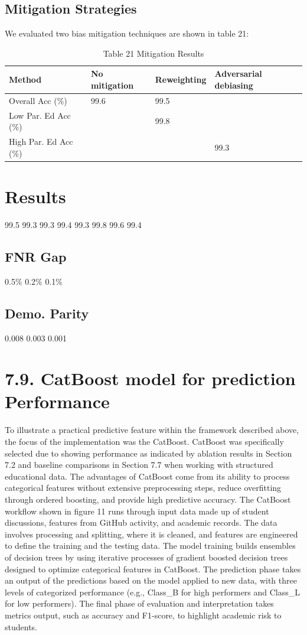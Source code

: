 \documentclass[twocolumn]{svjour3}
\begin{document}
\subsection{Mitigation Strategies}
We evaluated two bias mitigation techniques are shown in table 21:
\begin{table}
\centering
\caption{Table 21 Mitigation Results}
\begin{tabular}{lll}
\hline
Method & No mitigation & Reweighting & Adversarial debiasing \\
\hline
Overall Acc (\%) & 99.6 & 99.5 & \\
Low Par. Ed Acc (\%) & & 99.8 & \\
High Par. Ed Acc (\%) & & & 99.3 \\
\hline
\end{tabular}
\end{table}

\section{Results}
99.5
99.3
99.3
99.4
99.3
99.8
99.6
99.4
\subsection{FNR Gap}
0.5\%
0.2\%
0.1\%
\subsection{Demo. Parity}
0.008
0.003
0.001
\section{7.9. CatBoost model for prediction Performance}
To illustrate a practical predictive feature within the framework described above, the focus of the implementation was the CatBoost. CatBoost was specifically selected due to showing performance as indicated by ablation results in Section 7.2 and baseline comparisons in Section 7.7 when working with structured educational data. The advantages of CatBoost come from its ability to process categorical features without extensive preprocessing steps, reduce overfitting through ordered boosting, and provide high predictive accuracy. The CatBoost workflow shown in figure 11 runs through input data made up of student discussions, features from GitHub activity, and academic records. The data involves processing and splitting, where it is cleaned, and features are engineered to define the training and the testing data. The model training builds ensembles of decision trees by using iterative processes of gradient boosted decision trees designed to optimize categorical features in CatBoost. The prediction phase takes an output of the predictions based on the model applied to new data, with three levels of categorized performance (e.g., Class\_B for high performers and Class\_L for low performers). The final phase of evaluation and interpretation takes metrics output, such as accuracy and F1-score, to highlight academic risk to students.
\end{document}
